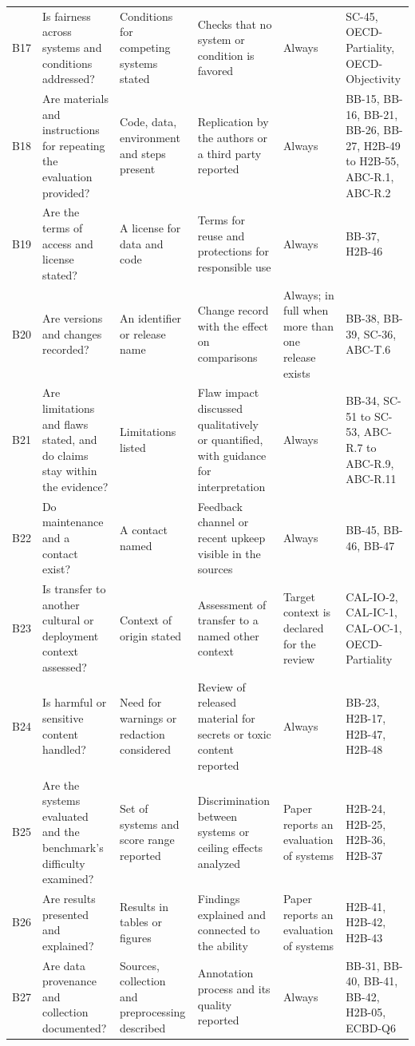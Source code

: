 \documentclass[10pt,conference]{IEEEtran}
\begin{document}
\begin{table}[t]
\begin{tabularx}{\textwidth}{@{}lXXXXl@{}}
B17 & Is fairness across systems and conditions addressed? & Conditions for competing systems stated & Checks that no system or condition is favored & Always & SC-45, OECD-Partiality, OECD-Objectivity \\
B18 & Are materials and instructions for repeating the evaluation provided? & Code, data, environment and steps present & Replication by the authors or a third party reported & Always & BB-15, BB-16, BB-21, BB-26, BB-27, H2B-49 to H2B-55, ABC-R.1, ABC-R.2 \\
B19 & Are the terms of access and license stated? & A license for data and code & Terms for reuse and protections for responsible use & Always & BB-37, H2B-46 \\
B20 & Are versions and changes recorded? & An identifier or release name & Change record with the effect on comparisons & Always; in full when more than one release exists & BB-38, BB-39, SC-36, ABC-T.6 \\
B21 & Are limitations and flaws stated, and do claims stay within the evidence? & Limitations listed & Flaw impact discussed qualitatively or quantified, with guidance for interpretation & Always & BB-34, SC-51 to SC-53, ABC-R.7 to ABC-R.9, ABC-R.11 \\
B22 & Do maintenance and a contact exist? & A contact named & Feedback channel or recent upkeep visible in the sources & Always & BB-45, BB-46, BB-47 \\
B23 & Is transfer to another cultural or deployment context assessed? & Context of origin stated & Assessment of transfer to a named other context & Target context is declared for the review & CAL-IO-2, CAL-IC-1, CAL-OC-1, OECD-Partiality \\
B24 & Is harmful or sensitive content handled? & Need for warnings or redaction considered & Review of released material for secrets or toxic content reported & Always & BB-23, H2B-17, H2B-47, H2B-48 \\
B25 & Are the systems evaluated and the benchmark's difficulty examined? & Set of systems and score range reported & Discrimination between systems or ceiling effects analyzed & Paper reports an evaluation of systems & H2B-24, H2B-25, H2B-36, H2B-37 \\
B26 & Are results presented and explained? & Results in tables or figures & Findings explained and connected to the ability & Paper reports an evaluation of systems & H2B-41, H2B-42, H2B-43 \\
B27 & Are data provenance and collection documented? & Sources, collection and preprocessing described & Annotation process and its quality reported & Always & BB-31, BB-40, BB-41, BB-42, H2B-05, ECBD-Q6 \\

\end{tabularx}
\end{table}
\end{document}
